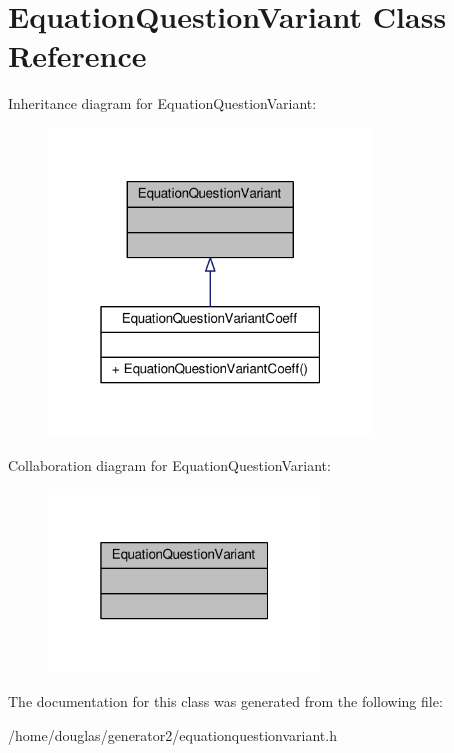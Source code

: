\hypertarget{classEquationQuestionVariant}{}\section{Equation\+Question\+Variant Class Reference}
\label{classEquationQuestionVariant}


Inheritance diagram for Equation\+Question\+Variant\+:
\nopagebreak
\begin{figure}[H]
\begin{center}
\leavevmode
\includegraphics[width=244pt]{classEquationQuestionVariant__inherit__graph}
\end{center}
\end{figure}


Collaboration diagram for Equation\+Question\+Variant\+:
\nopagebreak
\begin{figure}[H]
\begin{center}
\leavevmode
\includegraphics[width=205pt]{classEquationQuestionVariant__coll__graph}
\end{center}
\end{figure}


The documentation for this class was generated from the following file\+:\begin{DoxyCompactItemize}
\item 
/home/douglas/generator2/equationquestionvariant.\+h\end{DoxyCompactItemize}
